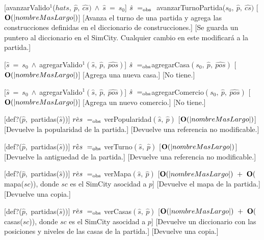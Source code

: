 \begin{Interfaz}
    [avanzarValido$^{1}$($hat{s},\ \hat{p},\ \hat{cs})\ \land\ \hat{s}\ =\ s_0$]
    {$\hat{s}\ =_{\mathrm{obs}}\ $ avanzarTurnoPartida($s_0,\ \hat{p},\ \hat{cs})$}
    [$\bold{O}(|nombreMasLargo|)$]
    [Avanza el turno de una partida y agrega las construcciones definidas en el diccionario de construcciones.]
    [Se guarda un puntero al diccionario en el SimCity. Cualquier cambio en este modificará a la partida.]

   
    [$\hat{s}\ =\ s_0\ \wedge\ $agregarValido$^{1}(\hat{s},\ \hat{p},\ \hat{pos})$]
    {$\hat{s}\ \igobs $agregarCasa$(s_0,\ \hat{p},\ \hat{pos})$}
    [$\bold{O}(|nombreMasLargo|)$]
    [Agrega una nueva casa.]
    [No tiene.]
 
    [$\hat{s}\ =\ s_0\ \wedge\ $agregarValido$^{1}(\hat{s},\ \hat{p},\ \hat{pos})$]
    {$\hat{s}\ \igobs $agregarComercio$(s_0,\ \hat{p},\ \hat{pos})$}
    [$\bold{O}(|nombreMasLargo|)$]
    [Agrega un nuevo comercio.]
    [No tiene.]
    
    [def?($\hat{p}$,\ partidas($\hat{s}$))]
    {$\hat{res}\ \igobs\ $verPopularidad$(\hat{s},\ \hat{p})$}
    [$\bold{O}(|nombreMasLargo|)$]
    [Devuelve la popularidad de la partida.]
    [Devuelve una referencia no modificable.]

    [def?($\hat{p}$,\ partidas($\hat{s}$))]
    {$\hat{res}\ \igobs\ $verTurno$(\hat{s},\ \hat{p})$}
    [$\bold{O}(|nombreMasLargo|)$]
    [Devuelve la antiguedad de la partida.]
    [Devuelve una referencia no modificable.]

    [def?($\hat{p}$,\ partidas($\hat{s}$))]
    {$\hat{res}\ \igobs\ $verMapa$(\hat{s},\ \hat{p})$}
    [$\bold{O}(|nombreMasLargo|)\ +\ \bold{O}($mapa($sc$)), donde $sc$ es el SimCity asocidad a $p$]
    [Devuelve el mapa de la partida.]
    [Devuelve una copia.]

    [def?($\hat{p}$,\ partidas($\hat{s}$))]
    {$\hat{res}\ \igobs\ $verCasas$(\hat{s},\ \hat{p})$}
    [$\bold{O}(|nombreMasLargo|)\ +\ \bold{O}($casas($sc$)), donde $sc$ es el SimCity asocidad a $p$]
    [Devuelve un diccionario con las posiciones y niveles de las casas de la partida.]
    [Devuelve una copia.]


\end{Interfaz}
